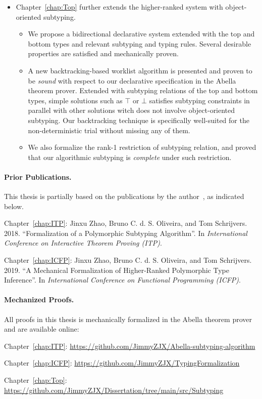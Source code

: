 \begin{itemize}
  \item Chapter~\ref{chap:Top}
    further extends the higher-ranked system with object-oriented subtyping.
    \begin{itemize}
      \item We propose a bidirectional declarative system extended with
        the top and bottom types and relevant subtyping and typing rules.
        Several desirable properties are satisfied and mechanically proven.
      \item A new backtracking-based worklist algorithm is presented and
        proven to be \emph{sound} with respect to our declarative specification
        in the Abella theorem prover.
        Extended with subtyping relations of the top and bottom types,
        simple solutions such as $\top$ or $\bot$ satisfies subtyping constraints
        in parallel with other solutions witch does not involve object-oriented subtyping.
        Our backtracking technique is specifically well-suited for the
        non-deterministic trial without missing any of them.
      \item We also formalize the rank-1 restriction of subtyping relation,
        and proved that our algorithmic subtyping is \emph{complete} under such restriction.
    \end{itemize}
\end{itemize}



\paragraph{Prior Publications.}
This thesis is partially based on the publications by the author~\citep{itp2018,icfp2019},
as indicated below.
\begin{description}
\item Chapter~\ref{chap:ITP}: Jinxu Zhao, Bruno C. d. S. Oliveira, and Tom Schrijvers. 2018.
  ``Formalization of a Polymorphic Subtyping Algorithm''.
  In \emph{International Conference on Interactive Theorem Proving (ITP)}.
\item Chapter~\ref{chap:ICFP}: Jinxu Zhao, Bruno C. d. S. Oliveira, and Tom Schrijvers. 2019.
  ``A Mechanical Formalization of Higher-Ranked Polymorphic Type Inference''.
  In \emph{International Conference on Functional Programming (ICFP)}.
\end{description}

\paragraph{Mechanized Proofs.}
All proofs in this thesis is mechanically formalized in the Abella theorem prover
and are available online:
\begin{description}
  \item Chapter~\ref{chap:ITP}: \url{https://github.com/JimmyZJX/Abella-subtyping-algorithm}
  \item Chapter~\ref{chap:ICFP}: \url{https://github.com/JimmyZJX/TypingFormalization}
  \item Chapter~\ref{chap:Top}: \url{https://github.com/JimmyZJX/Dissertation/tree/main/src/Subtyping}
\end{description}

\noindent\makebox[\linewidth]{\rule{0.7\textwidth}{0.4pt}}

\vspace{1.5\baselineskip}



